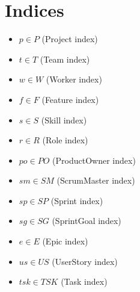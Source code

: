 \documentclass{article}
\begin{document}
\section{Indices}
\begin{itemize}
    \item $p \in P$ (Project index)
    \item $t \in T$ (Team index)
    \item $w \in W$ (Worker index)
    \item $f \in F$ (Feature index)
    \item $s \in S$ (Skill index)
    \item $r \in R$ (Role index)
    \item $po \in PO$ (ProductOwner index)
    \item $sm \in SM$ (ScrumMaster index)
    \item $sp \in SP$ (Sprint index)
    \item $sg \in SG$ (SprintGoal index)
    \item $e \in E$ (Epic index)
    \item $us \in US$ (UserStory index)
    \item $tsk \in TSK$ (Task index)
\end{itemize}
\end{document}
